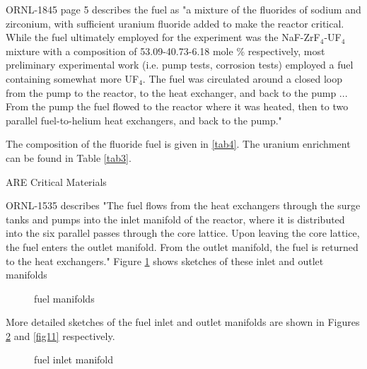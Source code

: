 \documentclass[ms,a4paper]{memoir}
\newcommand*{\msrarchive}{../../msr-archive}%
\begin{document}
ORNL-1845 page 5 describes the fuel as "a mixture of the fluorides of sodium and zirconium, with sufficient uranium fluoride added to make the reactor critical. While the fuel ultimately employed for the experiment was the NaF-ZrF$_4$-UF$_4$ mixture with a composition of 53.09-40.73-6.18 mole \% respectively, most preliminary experimental work (i.e. pump tests, corrosion tests) employed a fuel containing somewhat more UF$_4$. The fuel was circulated around a closed loop from the pump to the reactor, to the heat exchanger, and back to the pump ... From the pump the fuel flowed to the reactor where it was heated, then to two parallel fuel-to-helium heat exchangers, and back to the pump."

The composition of the fluoride fuel is given in \ref{tab4}. The uranium enrichment can be found in Table \ref{tab3}.

\begin{table}[H]
  \centering
  \caption{ARE Critical Materials \parencite[Appendix B.2.a]{ornl-1845}}
  \label{tab4}
\end{table}

ORNL-1535 describes "The fuel flows from the heat exchangers through the surge tanks and pumps into the inlet manifold of the reactor, where it is distributed into the six parallel passes through the core lattice. Upon leaving the core lattice, the fuel enters the outlet manifold. From the outlet manifold, the fuel is returned to the heat exchangers." Figure \ref{fig9} shows sketches of these inlet and outlet manifolds

\begin{figure}[H]
  \centering
  \caption{fuel manifolds \parencite[Figure 20]{ornl-1535}}
  \label{fig9}
\end{figure}

More detailed sketches of the fuel inlet and outlet manifolds are shown in Figures \ref{fig10} and \ref{fig11} respectively.

\begin{figure}[H]
  \centering
  \caption{fuel inlet manifold \parencite[Figure 22]{ornl-1535}}
  \label{fig10}
\end{figure}
\end{document}
